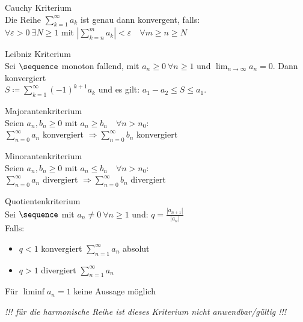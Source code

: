 \begin{concept} {Cauchy Kriterium}\\
    Die Reihe $\sum_{k=1}^\infty a_k$ ist genau dann konvergent, falls:\\
    $\forall \varepsilon > 0 ~\exists N \geq 1$ mit $\left|\sum_{k=n}^m a_k \right| < \varepsilon \quad \forall m \geq n \geq N$
\end{concept}

\begin{concept} {Leibniz Kriterium}\\
    Sei $\sequence$ monoton fallend, mit $a_n \geq 0~\forall n \geq 1$ und $\lim_{n \to \infty} a_n = 0$. Dann konvergiert\\
    $S \coloneqq \sum_{k = 1}^{\infty} (-1)^{k+1} a_k$
    und es gilt: $a_1 - a_2 \leq S \leq a_1$.
\end{concept}

\begin{concept} {Majorantenkriterium}\\
    Seien $a_n, b_n \geq 0$ mit $a_n \geq b_n \quad \forall n > n_0$:\\
    $\sum_{n=0}^\infty a_n$ konvergiert $\Rightarrow \sum_{n=0}^\infty b_n$ konvergiert 
\end{concept}

\begin{concept} {Minorantenkriterium}\\
    Seien $a_n, b_n \geq 0$ mit $a_n \leq b_n \quad \forall n > n_0$:\\
    $\sum_{n=0}^\infty a_n$ divergiert $\Rightarrow \sum_{n=0}^\infty b_n$ divergiert 
\end{concept}

\begin{concept} {Quotientenkriterium}\\
    Sei $\sequence$ mit $a_n \neq 0~\forall n \geq 1$ und: $q = \frac{|a_{n + 1}|}{|a_n|}$\\
    Falls:
    \begin{itemize}
        \item $q < 1$ konvergiert $\sum_{n=1}^\infty a_n$ absolut
        \item $q > 1$ divergiert $\sum_{n=1}^\infty a_n$
    \end{itemize}
    Für $\liminf a_n = 1$ keine Aussage möglich

    \emph{!!! für die harmonische Reihe ist dieses Kriterium nicht anwendbar/gültig !!!}
\end{concept}

